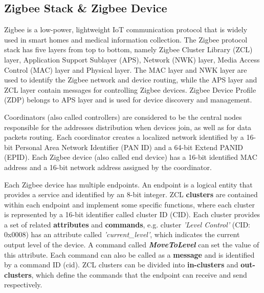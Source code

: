 \documentclass[10pt,journal,compsoc]{IEEEtran}
\begin{document}
\subsection{Zigbee Stack \& Zigbee Device}


Zigbee is a low-power, lightweight IoT communication protocol that is widely used in smart homes and medical information collection. The Zigbee protocol stack has five layers from top to bottom, namely Zigbee Cluster Library (ZCL) layer, Application Support Sublayer (APS), Network (NWK) layer, Media Access Control (MAC) layer and Physical layer. The MAC layer and NWK layer are used to identify the Zigbee network and device routing, while the APS layer and ZCL layer contain messages for controlling Zigbee devices. Zigbee Device Profile (ZDP) belongs to APS layer and is used for device discovery and management. 

Coordinators (also called controllers) are considered to be the central nodes responsible for the addresses distribution when devices join, as well as for data packets routing. Each coordinator creates a localized network identified by a 16-bit Personal Area Network Identifier (PAN ID) and a 64-bit Extend PANID (EPID). Each Zigbee device (also called end device) has a 16-bit identified MAC address and a 16-bit network address assigned by the coordinator.

Each Zigbee device has multiple endpoints. An endpoint is a logical entity that provides a service and identified by an 8-bit integer. ZCL \textbf{clusters} are contained within each endpoint and implement some specific functions, where each cluster is represented by a 16-bit identifier called cluster ID (CID). Each cluster provides a set of related \textbf{attributes} and \textbf{commands}, e.g. cluster \emph{'Level Control'} (CID: 0x0008) has an attribute called \emph{'current\_level'}, which indicates the current output level of the device. A command called \textbf{\emph{MoveToLevel}} can set the value of this attribute. Each command can also be called as a \textbf{message} and is identified by a command ID (cid). ZCL clusters can be divided into \textbf{in-clusters} and \textbf{out-clusters}, which define the commands that the endpoint can receive and send respectively.
\end{document}

